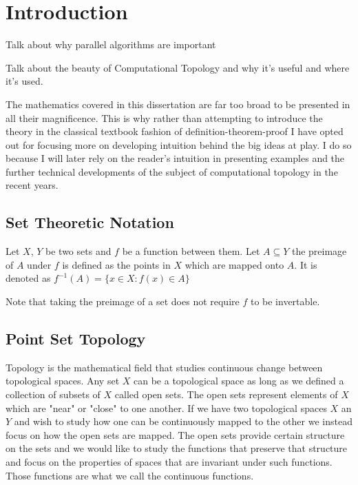 \chapter{Introduction}
\label{chapter2}

Talk about why parallel algorithms are important

Talk about the beauty of Computational Topology and why it's useful and where it's used. 

The mathematics covered in this dissertation are far too broad to be presented in all their magnificence. This is why rather than attempting to introduce the theory in the classical textbook fashion of definition-theorem-proof I have opted out for focusing more on developing intuition behind the big ideas at play. I do so because I will later rely on the reader's intuition in presenting examples and the further technical developments of the subject of computational topology in the recent years. 

\section{Set Theoretic Notation}


\begin{defn} Let $X$, $Y$ be two sets and $f$ be a function between them. Let $A \subseteq Y$ the preimage of $A$ under $f$ is defined as the points in $X$ which are mapped onto $A$. It is denoted as $f^{-1}(A) = \{x \in X : f(x) \in A\}$  \end{defn}

Note that taking the preimage of a set does not require $f$ to be invertable.

\section{Point Set Topology}

Topology is the mathematical field that studies continuous change between topological spaces. Any set $X$ can be a topological space as long as we defined a collection of subsets of $X$ called open sets. The open sets represent elements of $X$ which are "near" or "close" to one another. If we have two topological spaces $X$ an $Y$ and wish to study how one can be continuously mapped to the other we instead focus on how the open sets are mapped. The open sets provide certain structure on the sets and we would like to study the functions that preserve that structure and focus on the properties of spaces that are invariant under such functions. Those functions are what we call the continuous functions.

